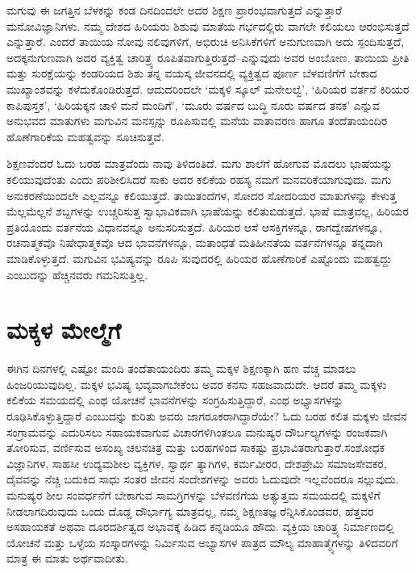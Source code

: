 ಮಗುವು ಈ ಜಗತ್ತಿನ ಬೆಳಕನ್ನು ಕಂಡ ದಿನದಿಂದಲೇ ಅದರ ಶಿಕ್ಷಣ ಪ್ರಾರಂಭವಾಗುತ್ತದೆ ಎನ್ನುತ್ತಾರೆ ಮನೋವಿಜ್ಞಾನಿಗಳು. ನಮ್ಮ ದೇಶದ ಹಿರಿಯರು ಶಿಶುವು ಮಾತೆಯ ಗರ್ಭದಲ್ಲಿರು ವಾಗಲೇ ಕಲಿಯಲು ಆರಂಭಿಸುತ್ತದೆ ಎನ್ನುತ್ತಾರೆ. ಎಂದರೆ ತಾಯಿಯ ನೋವು ನಲಿವುಗಳಿಗೆ, ಅಭಿರುಚಿ ಅನಿಸಿಕೆಗಳಿಗೆ ಅನುಗುಣವಾಗಿ ಅದು ಸ್ಪಂದಿಸುತ್ತದೆ, ಅದಕ್ಕನುಗುಣವಾಗಿ ಅದರ ವ್ಯಕ್ತಿತ್ವ ಚಾರಿತ್ರ್ಯ ರೂಪಿತವಾಗುತ್ತಿರುತ್ತದೆ–ಎನ್ನುವುದು ಅವರ ಅಂಬೋಣ. ತಾಯಿಯ ಪ್ರೀತಿ ಮತ್ತು ಸುರಕ್ಷೆಯನ್ನು ಕಂಡರಿಯದ ಶಿಶು ತನ್ನ ವಯಸ್ಕ ಜೀವನದಲ್ಲಿ ವ್ಯಕ್ತಿತ್ವದ ಪೂರ್ಣ ಬೆಳವಣಿಗೆಗೆ ಬೇಕಾದ ಮುಖ್ಯಾಂಶವನ್ನು ಕಳೆದುಕೊಂಡಿರುತ್ತದೆ. ಆದುದರಿಂದಲೇ ‘ಮಕ್ಕಳಿ ಸ್ಕೂಲ್ ಮನೇಲಲ್ವೆ’, ‘ಹಿರಿಯರ ವರ್ತನೆ ಕಿರಿಯರ ಕಾಪಿಪುಸ್ತಕ’, ‘ಹಿರಿಯಕ್ಕನ ಚಾಳಿ ಮನೆ ಮಂದಿಗೆ’, ‘ಮೂರು ವರ್ಷದ ಬುದ್ಧಿ ನೂರು ವರ್ಷದ ತನಕ’ ಎನ್ನುವ ಅನುಭವದ ಮಾತುಗಳು ಮಗುವಿನ ಮನಸ್ಸನ್ನು ರೂಪಿಸುವಲ್ಲಿ ಮನೆಯ ವಾತಾವರಣ ಹಾಗೂ ತಂದೆತಾಯಂದಿರ ಹೊಣೆಗಾರಿಕೆಯ ಮಹತ್ವವನ್ನು ಸೂಚಿಸುತ್ತವೆ.

ಶಿಕ್ಷಣವೆಂದರೆ ಓದು ಬರಹ ಮಾತ್ರವೆಂದು ನಾವು ತಿಳಿದಂತಿದೆ. ಮಗು ಶಾಲೆಗೆ ಹೋಗುವ ಮೊದಲು ಭಾಷೆಯನ್ನು ಕಲಿಯುವುದೆಂತು ಎಂದು ಪರಿಶೀಲಿಸಿದರೆ ಸಾಕು ಅದರ ಕಲಿಕೆಯ ರಹಸ್ಯ ನಮಗೆ ಮನವರಿಕೆಯಾಗುವುದು. ಮಗು ಅನುಕರಣೆಯಿಂದಲೇ ಎಲ್ಲವನ್ನೂ ಕಲಿಯುತ್ತದೆ. ತಾಯಿತಂದೆಗಳ, ಸೋದರ ಸೋದರಿಯರ ಮಾತುಗಳನ್ನು ಕೇಳುತ್ತ ಮೆಲ್ಲಮೆಲ್ಲನೆ ಶಬ್ದಗಳನ್ನು ಉಚ್ಚರಿಸುತ್ತ ಸ್ವಾಭಾವಿಕವಾಗಿ ಭಾಷೆಯನ್ನು ಕಲಿತುಬಿಡುತ್ತದೆ. ಭಾಷೆ ಮಾತ್ರವಲ್ಲ, ಹಿರಿಯರ ಪ್ರತಿಯೊಂದು ವರ್ತನೆಯ ವಿಧಾನವನ್ನೂ ಅನುಸರಿಸುತ್ತದೆ. ಹಿರಿಯರ ಆಸೆ ಆಸಕ್ತಿಗಳನ್ನೂ, ರಾಗದ್ವೇಷಗಳನ್ನೂ, ರಚನಾತ್ಮಕವೊ ನಿಷೇಧಾತ್ಮಕವೊ ಆದ ಭಾವನೆಗಳನ್ನೂ, ಮತಾಂಧತೆ ಮತಿಹೀನತೆಯ ವರ್ತನೆಗಳನ್ನೂ ತನ್ನದಾಗಿ ಮಾಡಿಕೊಳ್ಳುತ್ತದೆ. ಮಗುವಿನ ಭವಿಷ್ಯವನ್ನು ರೂಪಿ ಸುವುದರಲ್ಲಿ ಹಿರಿಯರ ಹೊಣೆಗಾರಿಕೆ ಎಷ್ಟೊಂದು ಮಹತ್ವದ್ದು ಎಂಬುದನ್ನು ಹೆಚ್ಚಿನವರು ಗಮನಿಸುತ್ತಿಲ್ಲ.


\section*{ಮಕ್ಕಳ ಮೇಲ್ಮೆಗೆ}


ಈಗಿನ ದಿನಗಳಲ್ಲಿ ಎಷ್ಟೋ ಮಂದಿ ತಂದೆತಾಯಂದಿರು ತಮ್ಮ ಮಕ್ಕಳ ಶಿಕ್ಷಣಕ್ಕಾಗಿ ಹಣ ವೆಚ್ಚ ಮಾಡಲು ಹಿಂಜರಿಯುವುದಿಲ್ಲ. ಮಕ್ಕಳ ಭವಿಷ್ಯ ಭವ್ಯವಾಗಬೇಕೆಂಬ ಅವರ ಕನಸು ಸಹಜ\-ವಾದುದೇ. ಆದರೆ ತಮ್ಮ ಮಕ್ಕಳು ಕಲಿಕೆಯ ಸಮಯದಲ್ಲಿ ಎಂಥ ಯೋಚನೆ ಭಾವನೆಗಳನ್ನು ಸಂಗ್ರಹಿಸುತ್ತಿದ್ದಾರೆ, ಎಂಥ ಅಭ್ಯಾಸಗಳನ್ನು ರೂಢಿಸಿಕೊಳ್ಳುತ್ತಿದ್ದಾರೆ ಎಂಬುದನ್ನು ಕುರಿತು ಅವರು ಜಾಗರೂಕರಾಗಿದ್ದಾರೆಯೇ? ಓದು ಬರಹ ಕಲಿತ ಮಕ್ಕಳು ಜೀವನ ಸಂಗ್ರಾಮವನ್ನು ಎದುರಿಸಲು ಸಹಾಯಕವಾಗುವ ವಿಚಾರಗಳಿಗಿಂತಲೂ ಮನುಷ್ಯರ ದೌರ್ಬಲ್ಯಗಳನ್ನು ರಂಜಕವಾಗಿ ತೋರಿ\-ಸುವ, ವರ್ಣಿಸುವ ಅಸಂಖ್ಯ ಚಲನಚಿತ್ರ ಮತ್ತು ಬರಹಗಳಿಂದ ಸಾಕಷ್ಟು ಪ್ರಭಾವಿತರಾಗುತ್ತಾರೆ.\break ಸಂಶೋಧಕ ವಿಜ್ಞಾನಿಗಳ, ಸಾಹಸೀ ಉದ್ಯಮಶೀಲ ವ್ಯಕ್ತಿಗಳ, ಸ್ವಾರ್ಥ ತ್ಯಾಗಿಗಳ, ಕರ್ಮವೀರರ, ದೇಶಪ್ರೇಮಿ ಸಮಾಜಸೇವಕರ, ದೈವವನ್ನು ನೆಚ್ಚಿ ಬದುಕಿದ ಸಾಧು ಸಂತರ ಜೀವನ ಸಂದೇಶಗಳನ್ನು ಅವರು ಓದುವುದೇ ಇಲ್ಲವೆಂದರೂ ಸಲ್ಲುವುದು. ಮನುಷ್ಯರ ಶೀಲ ಸಂವರ್ಧನೆಗೆ ಬೇಕಾಗುವ ಸಾಮಗ್ರಿಗಳನ್ನು ಬೆಳವಣಿಗೆಯ ಅತ್ಯುತ್ತಮ ಸಮಯದಲ್ಲಿ ಮಕ್ಕಳಿಗೆ ನೀಡಲಾಗದಿರುವುದು ಒಂದು ದೊಡ್ಡ ದೌರ್ಭಾಗ್ಯ ಮಾತ್ರವಲ್ಲ, ನಮ್ಮ ಶಿಕ್ಷಣತಜ್ಞ ರೆನ್ನಿಸಿಕೊಂಡವರ, ಹೆತ್ತವರ ಅಸಹಾಯಕತೆ ಅಥವಾ ದೂರದರ್ಶಿತ್ವದ ಅಭಾವಕ್ಕೆ ಹಿಡಿದ ಕನ್ನಡಿಯೂ ಹೌದು. ವ್ಯಕ್ತಿಯ ಚಾರಿತ್ರ್ಯ ನಿರ್ಮಾಣದಲ್ಲಿ ಯೋಚನೆ ಮತ್ತು ಒಳ್ಳೆಯ ಸಂಸ್ಕಾರಗಳನ್ನು ನಿರ್ಮಿಸುವ ಅಭ್ಯಾಸಗಳ ಪಾತ್ರದ ಮೌಲ್ಯ ಮಾಹಾತ್ಮ್ಯೆಗಳನ್ನು ತಿಳಿದವರಿಗೆ ಮಾತ್ರ ಈ ಮಾತು ಅರ್ಥವಾದೀತು.

